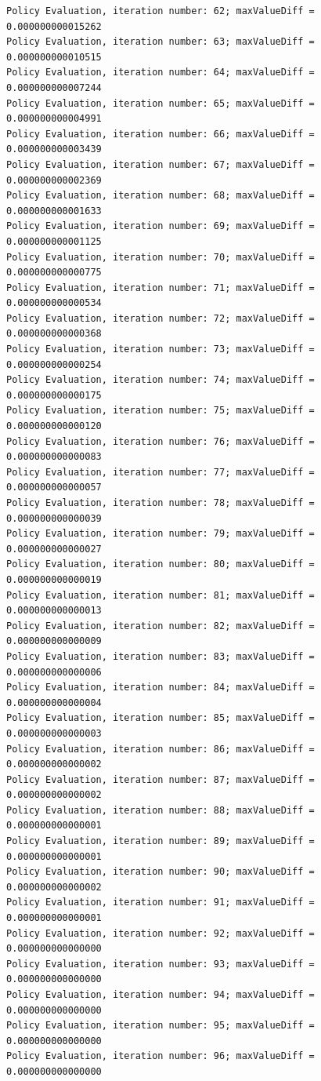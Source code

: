 \documentclass{article}
\begin{document}
\begin{scriptsize}
\begin{verbatim}
Policy Evaluation, iteration number: 62; maxValueDiff = 0.000000000015262 
Policy Evaluation, iteration number: 63; maxValueDiff = 0.000000000010515 
Policy Evaluation, iteration number: 64; maxValueDiff = 0.000000000007244 
Policy Evaluation, iteration number: 65; maxValueDiff = 0.000000000004991 
Policy Evaluation, iteration number: 66; maxValueDiff = 0.000000000003439 
Policy Evaluation, iteration number: 67; maxValueDiff = 0.000000000002369 
Policy Evaluation, iteration number: 68; maxValueDiff = 0.000000000001633 
Policy Evaluation, iteration number: 69; maxValueDiff = 0.000000000001125 
Policy Evaluation, iteration number: 70; maxValueDiff = 0.000000000000775 
Policy Evaluation, iteration number: 71; maxValueDiff = 0.000000000000534 
Policy Evaluation, iteration number: 72; maxValueDiff = 0.000000000000368 
Policy Evaluation, iteration number: 73; maxValueDiff = 0.000000000000254 
Policy Evaluation, iteration number: 74; maxValueDiff = 0.000000000000175 
Policy Evaluation, iteration number: 75; maxValueDiff = 0.000000000000120 
Policy Evaluation, iteration number: 76; maxValueDiff = 0.000000000000083 
Policy Evaluation, iteration number: 77; maxValueDiff = 0.000000000000057 
Policy Evaluation, iteration number: 78; maxValueDiff = 0.000000000000039 
Policy Evaluation, iteration number: 79; maxValueDiff = 0.000000000000027 
Policy Evaluation, iteration number: 80; maxValueDiff = 0.000000000000019 
Policy Evaluation, iteration number: 81; maxValueDiff = 0.000000000000013 
Policy Evaluation, iteration number: 82; maxValueDiff = 0.000000000000009 
Policy Evaluation, iteration number: 83; maxValueDiff = 0.000000000000006 
Policy Evaluation, iteration number: 84; maxValueDiff = 0.000000000000004 
Policy Evaluation, iteration number: 85; maxValueDiff = 0.000000000000003 
Policy Evaluation, iteration number: 86; maxValueDiff = 0.000000000000002 
Policy Evaluation, iteration number: 87; maxValueDiff = 0.000000000000002 
Policy Evaluation, iteration number: 88; maxValueDiff = 0.000000000000001 
Policy Evaluation, iteration number: 89; maxValueDiff = 0.000000000000001 
Policy Evaluation, iteration number: 90; maxValueDiff = 0.000000000000002 
Policy Evaluation, iteration number: 91; maxValueDiff = 0.000000000000001 
Policy Evaluation, iteration number: 92; maxValueDiff = 0.000000000000000 
Policy Evaluation, iteration number: 93; maxValueDiff = 0.000000000000000 
Policy Evaluation, iteration number: 94; maxValueDiff = 0.000000000000000 
Policy Evaluation, iteration number: 95; maxValueDiff = 0.000000000000000 
Policy Evaluation, iteration number: 96; maxValueDiff = 0.000000000000000 

\end{verbatim}
\end{scriptsize}
\end{document}
